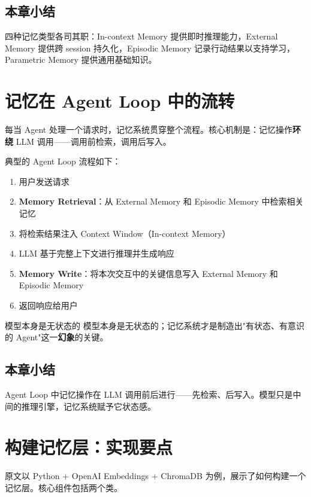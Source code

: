 \documentclass[a4paper]{article}
\begin{document}
\subsection{本章小结}

四种记忆类型各司其职：In-context Memory 提供即时推理能力，External Memory 提供跨 session 持久化，Episodic Memory 记录行动结果以支持学习，Parametric Memory 提供通用基础知识。

\section{记忆在 Agent Loop 中的流转}

每当 Agent 处理一个请求时，记忆系统贯穿整个流程。核心机制是：记忆操作\textbf{环绕} LLM 调用——调用前检索，调用后写入。

典型的 Agent Loop 流程如下：

\begin{enumerate}[leftmargin=2em]
    \item 用户发送请求
    \item \textbf{Memory Retrieval}：从 External Memory 和 Episodic Memory 中检索相关记忆
    \item 将检索结果注入 Context Window（In-context Memory）
    \item LLM 基于完整上下文进行推理并生成响应
    \item \textbf{Memory Write}：将本次交互中的关键信息写入 External Memory 和 Episodic Memory
    \item 返回响应给用户
\end{enumerate}

\begin{importantbox}{模型本身是无状态的}
模型本身是无状态的；记忆系统才是制造出"有状态、有意识的 Agent"这一\textbf{幻象}的关键。
\end{importantbox}

\subsection{本章小结}

Agent Loop 中记忆操作在 LLM 调用前后进行——先检索、后写入。模型只是中间的推理引擎，记忆系统赋予它状态感。

\section{构建记忆层：实现要点}

原文以 Python + OpenAI Embeddings + ChromaDB 为例，展示了如何构建一个记忆层。核心组件包括两个类。
\end{document}
